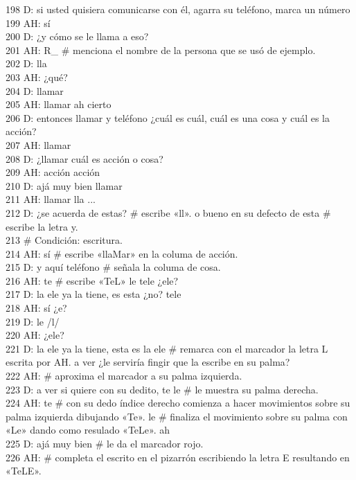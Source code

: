198 D: si usted quisiera comunicarse con él, agarra su teléfono, marca un número\\
199 AH: sí\\
200 D: ¿y cómo se le llama a eso?\\
201 AH: R\_ \# menciona el nombre de la persona que se usó de ejemplo.\\
202 D: lla\\
203 AH: ¿qué?\\
204 D: llamar\\
205 AH: llamar ah cierto\\
206 D: entonces llamar y teléfono ¿cuál es cuál, cuál es una cosa y cuál es la acción?\\
207 AH: llamar\\
208 D: ¿llamar cuál es acción o cosa?\\
209 AH: acción acción\\
210 D: ajá muy bien llamar\\
211 AH: llamar lla ...\\
212 D: ¿se acuerda de estas? \# escribe «ll». o bueno en su defecto de esta \# escribe la letra y.\\
213 \# Condición: escritura.\\
214 AH: sí \# escribe «llaMar» en la columa de acción.\\
215 D: y aquí teléfono \# señala la columa de cosa.\\
216 AH: te \# escribe «TeL» le tele ¿ele?\\
217 D: la ele ya la tiene, es esta ¿no? tele\\
218 AH: sí ¿e?\\
219 D: le /l/\\
220 AH: ¿ele?\\
221 D: la ele ya la tiene, esta es la ele \# remarca con el marcador la letra L escrita por AH. a ver ¿le serviría fingir que la escribe en su palma?\\
222 AH: \# aproxima el marcador a su palma izquierda.\\
223 D: a ver si quiere con su dedito, te le \# le muestra su palma derecha.\\
224 AH: te \# con su dedo índice derecho comienza a hacer movimientos sobre su palma izquierda dibujando «Te». le \# finaliza el movimiento sobre su palma con «Le» dando como resulado «TeLe». ah\\
225 D: ajá muy bien \# le da el marcador rojo.\\
226 AH: \# completa el escrito en el pizarrón escribiendo la letra E resultando en «TeLE».\\
